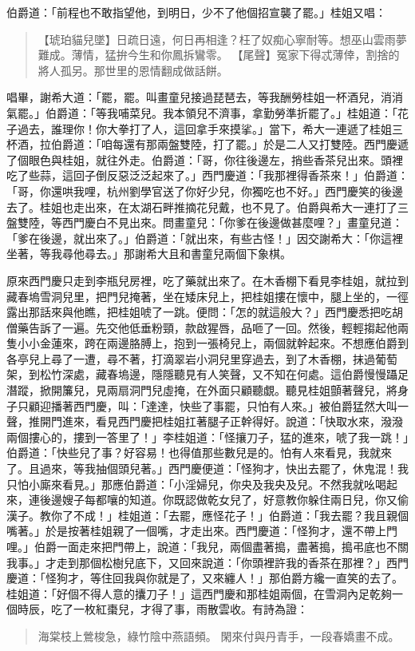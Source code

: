 伯爵道：「前程也不敢指望他，到明日，少不了他個招宣襲了罷。」桂姐又唱：
\begin{quote}
【琥珀貓兒墜】日疏日遠，何日再相逢？枉了奴痴心寧耐等。想巫山雲雨夢難成。薄情，猛拚今生和你鳳拆鸞零。
【尾聲】冤家下得忒薄倖，割捨的將人孤另。那世里的恩情翻成做話餅。
\end{quote}

唱畢，謝希大道：「罷，罷。叫畫童兒接過琵琶去，等我酬勞桂姐一杯酒兒，消消氣罷。」伯爵道：「等我哺菜兒。我本領兒不濟事，拿勤勞準折罷了。」桂姐道：「花子過去，誰理你！你大拳打了人，這回拿手來摸挲。」當下，希大一連遞了桂姐三杯酒，拉伯爵道：「咱每還有那兩盤雙陸，打了罷。」於是二人又打雙陸。西門慶遞了個眼色與桂姐，就往外走。伯爵道：「哥，你往後邊左，捎些香茶兒出來。頭裡吃了些蒜，這回子倒反惡泛泛起來了。」西門慶道：「我那裡得香茶來！」伯爵道：「哥，你還哄我哩，杭州劉學官送了你好少兒，你獨吃也不好。」西門慶笑的後邊去了。桂姐也走出來，在太湖石畔推摘花兒戴，也不見了。伯爵與希大一連打了三盤雙陸，等西門慶白不見出來。問畫童兒：「你爹在後邊做甚麼哩？」畫童兒道：「爹在後邊，就出來了。」伯爵道：「就出來，有些古怪！」因交謝希大：「你這裡坐著，等我尋他尋去。」那謝希大且和書童兒兩個下象棋。

原來西門慶只走到李瓶兒房裡，吃了藥就出來了。在木香棚下看見李桂姐，就拉到藏春塢雪洞兒里，把門兒掩著，坐在矮床兒上，把桂姐摟在懷中，腿上坐的，一徑露出那話來與他瞧，把桂姐唬了一跳。便問：「怎的就這般大？」西門慶悉把吃胡僧藥告訴了一遍。先交他低垂粉頸，款啟猩唇，品咂了一回。然後，輕輕搊起他兩隻小小金蓮來，跨在兩邊胳膊上，抱到一張椅兒上，兩個就幹起來。不想應伯爵到各亭兒上尋了一遭，尋不著，打滴翠岩小洞兒里穿過去，到了木香棚，抹過葡萄架，到松竹深處，藏春塢邊，隱隱聽見有人笑聲，又不知在何處。這伯爵慢慢躡足潛蹤，掀開簾兒，見兩扇洞門兒虛掩，在外面只顧聽覷。聽見桂姐顫著聲兒，將身子只顧迎播著西門慶，叫：「達達，快些了事罷，只怕有人來。」被伯爵猛然大叫一聲，推開門進來，看見西門慶把桂姐扛著腿子正幹得好。說道：「快取水來，潑潑兩個摟心的，摟到一答里了！」李桂姐道：「怪攘刀子，猛的進來，唬了我一跳！」伯爵道：「快些兒了事？好容易！也得值那些數兒是的。怕有人來看見，我就來了。且過來，等我抽個頭兒著。」西門慶便道：「怪狗才，快出去罷了，休鬼混！我只怕小廝來看見。」那應伯爵道：「小淫婦兒，你央及我央及兒。不然我就吆喝起來，連後邊嫂子每都嚷的知道。你既認做乾女兒了，好意教你躲住兩日兒，你又偷漢子。教你了不成！」桂姐道：「去罷，應怪花子！」伯爵道：「我去罷？我且親個嘴著。」於是按著桂姐親了一個嘴，才走出來。西門慶道：「怪狗才，還不帶上門哩。」伯爵一面走來把門帶上，說道：「我兒，兩個盡著搗，盡著搗，搗弔底也不關我事。」才走到那個松樹兒底下，又回來說道：「你頭裡許我的香茶在那裡？」西門慶道：「怪狗才，等住回我與你就是了，又來纏人！」那伯爵方纔一直笑的去了。桂姐道：「好個不得人意的攮刀子！」這西門慶和那桂姐兩個，在雪洞內足乾夠一個時辰，吃了一枚紅棗兒，才得了事，雨散雲收。有詩為證：
\begin{quote}
海棠枝上鶯梭急，綠竹陰中燕語頻。
閑來付與丹青手，一段春嬌畫不成。
\end{quote}


